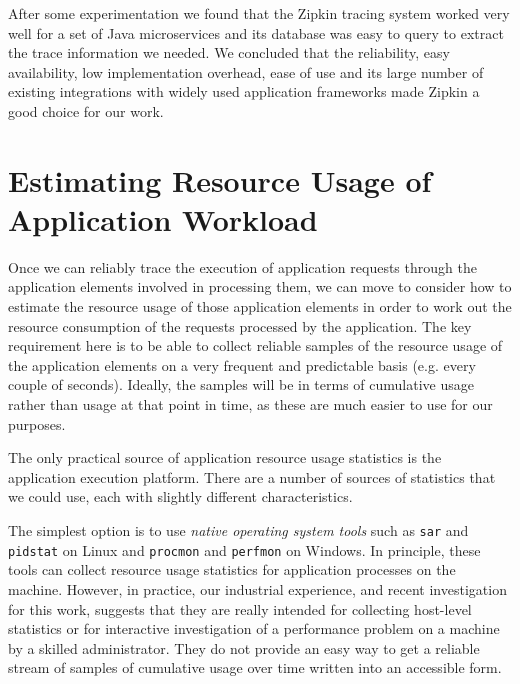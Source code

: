 After some experimentation we found that the Zipkin tracing system worked very well for a set of Java microservices and its database was easy to query to extract the trace information we needed.  We concluded that the reliability, easy availability, low implementation overhead, ease of use and its large number of existing integrations with widely used application frameworks made Zipkin a good choice for our work.

\section{Estimating Resource Usage of Application Workload}
\label{section:resusageofappworkload}

Once we can reliably trace the execution of application requests through the application elements involved in processing them, we can move to consider how to estimate the resource usage of those application elements in order to work out the resource consumption of the requests processed by the application.  The key requirement here is to be able to collect reliable samples of the resource usage of the application elements on a very frequent and predictable basis (e.g. every couple of seconds).  Ideally, the samples will be in terms of cumulative usage rather than usage at that point in time, as these are much easier to use for our purposes.

The only practical source of application resource usage statistics is the application execution platform.  There are a number of sources of statistics that we could use, each with slightly different characteristics.

The simplest option is to use \emph{native operating system tools} such as \texttt{sar} and \texttt{pidstat} on Linux and \texttt{procmon} and \texttt{perfmon} on Windows.  In principle, these tools can collect resource usage statistics for application processes on the machine.  However, in practice, our industrial experience, and recent investigation for this work, suggests that they are really intended for collecting host-level statistics or for interactive investigation of a performance problem on a machine by a skilled administrator.  They do not provide an easy way to get a reliable stream of samples of cumulative usage over time written into an accessible form.

